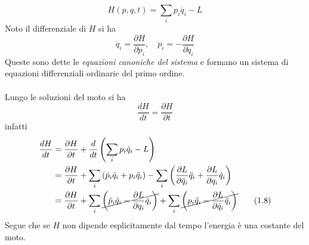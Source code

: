 \documentclass{article}
\begin{document}
\begin{equation}
    H(p, q, t) = \sum_i p_i\dot{q_i} - L \tag{1.5}
\end{equation}
Noto il differenziale di $H$ si ha
\begin{equation}
    \dot{q}_i = \frac{\partial H}{\partial p_i}, \quad \dot{p}_i = -\frac{\partial H}{\partial q_i} \tag{1.6}
\end{equation}
Queste sono dette le \textit{equazioni canoniche del sistema} e formano un sistema di equazioni differenziali ordinarie del primo ordine. \\ \\
Lungo le soluzioni del moto si ha
\begin{equation}
    \frac{dH}{dt} = \frac{\partial H}{\partial t} \tag{1.7}
\end{equation}
infatti
\begin{align}
    \frac{dH}{dt} &= \frac{\partial H}{\partial t} + \frac{d}{dt}\left(\sum_i p_i\dot{q}_i - L\right) \notag \\
    &= \frac{\partial H}{\partial t} + \sum_i\left(\dot{p}_i\dot{q}_i + p_i\ddot{q}_i\right) - \sum_i\left( \frac{\partial L}{\partial \dot{q}_i}\ddot{q}_i + \frac{\partial L}{\partial q_i}\dot{q}_i\right) \notag \\
    &= \frac{\partial H}{\partial t} + \sum_i\cancel{\left(\dot{p}_i\dot{q}_i - \frac{\partial L}{\partial q_i}\dot{q}_i\right)} + \sum_i\cancel{\left(p_i\ddot{q}_i - \frac{\partial L}{\partial \dot{q}_i}\ddot{q}_i\right)} \tag{1.8} 
\end{align}
Segue che se $H$ non dipende esplicitamente dal tempo l'energia è una costante del moto.

\newpage
\end{document}
